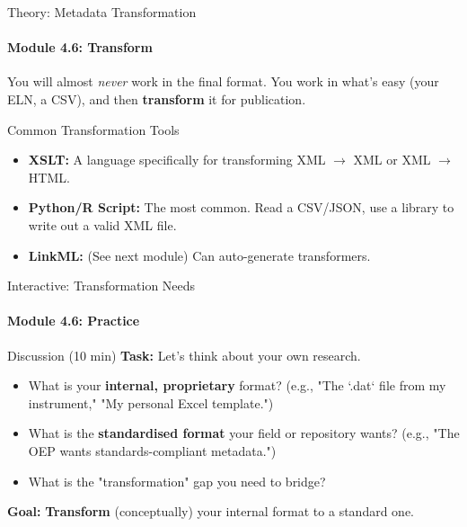 \begin{frame}{Theory: Metadata Transformation}
    \framesubtitle{Module 4.6: Transform}
    You will almost \textit{never} work in the final format. You work in what's easy (your ELN, a CSV), and then \textbf{transform} it for publication.
    
    
    \begin{block}{Common Transformation Tools}
        \begin{itemize}
            \item \textbf{XSLT:} A language specifically for transforming XML $\rightarrow$ XML or XML $\rightarrow$ HTML.
            \item \textbf{Python/R Script:} The most common. Read a CSV/JSON, use a library to write out a valid XML file.
            \item \textbf{LinkML:} (See next module) Can auto-generate transformers.
        \end{itemize}
    \end{block}
\end{frame}

\begin{frame}{Interactive: Transformation Needs}
    \framesubtitle{Module 4.6: Practice}
    \begin{block}{Discussion (10 min)}
        \textbf{Task:} Let's think about your own research.
        \begin{itemize}
            \item What is your \textbf{internal, proprietary} format? (e.g., "The `.dat` file from my instrument," "My personal Excel template.")
            \pause
            \item What is the \textbf{standardised format} your field or repository wants? (e.g., "The OEP wants standards-compliant metadata.")
            \pause
            \item What is the "transformation" gap you need to bridge?
        \end{itemize}
        \pause
        \textbf{Goal:} \textbf{Transform} (conceptually) your internal format to a standard one.
    \end{block}
\end{frame}

